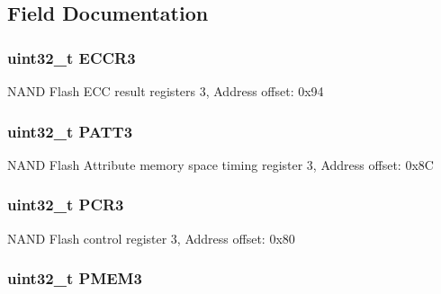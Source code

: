 \subsection{Field Documentation}
\hypertarget{struct_f_s_m_c___bank3___type_def_a6062be7dc144c07e01c303cb49d69ce2}{
\subsubsection[{E\-C\-C\-R3}]{ uint32\-\_\-t E\-C\-C\-R3}}\label{struct_f_s_m_c___bank3___type_def_a6062be7dc144c07e01c303cb49d69ce2}
N\-A\-N\-D Flash E\-C\-C result registers 3, Address offset\-: 0x94 \hypertarget{struct_f_s_m_c___bank3___type_def_aba03fea9c1bb2242d963e29f1b94d25e}{
\subsubsection[{P\-A\-T\-T3}]{ uint32\-\_\-t P\-A\-T\-T3}}\label{struct_f_s_m_c___bank3___type_def_aba03fea9c1bb2242d963e29f1b94d25e}
N\-A\-N\-D Flash Attribute memory space timing register 3, Address offset\-: 0x8\-C \hypertarget{struct_f_s_m_c___bank3___type_def_a73861fa74b83973fa1b5f92735c042ef}{
\subsubsection[{P\-C\-R3}]{ uint32\-\_\-t P\-C\-R3}}\label{struct_f_s_m_c___bank3___type_def_a73861fa74b83973fa1b5f92735c042ef}
N\-A\-N\-D Flash control register 3, Address offset\-: 0x80 \hypertarget{struct_f_s_m_c___bank3___type_def_aba8981e4f06cfb3db7d9959242052f80}{
\subsubsection[{P\-M\-E\-M3}]{ uint32\-\_\-t P\-M\-E\-M3}}\label{struct_f_s_m_c___bank3___type_def_aba8981e4f06cfb3db7d9959242052f80}
